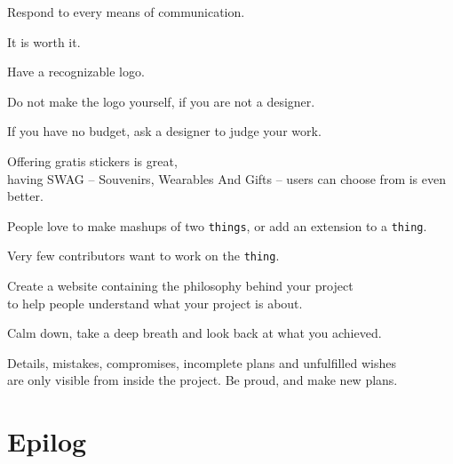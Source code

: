 \documentclass[t,handout,aspectratio=169]{beamer}
\begin{document}
\begin{frame}[fragile]%
    \vfill
    Respond to every means of communication.

    It is worth it.
\end{frame}

\begin{frame}[fragile]%
    \vfill
    Have a recognizable logo. \pause

    Do not make the logo yourself, if you are not a designer. \pause

    If you have no budget, ask a designer to judge your work.
\end{frame}

\begin{frame}[fragile]%
    \vfill
    Offering gratis stickers is great, \pause \\
    having SWAG -- Souvenirs, Wearables And Gifts -- users can choose from is even better.
\end{frame}

\begin{frame}[fragile]%
    \vfill
    People love to make mashups of two \texttt{things}, or add an extension to a \texttt{thing}. \pause

    Very few contributors want to work on the \texttt{thing}.
\end{frame}

\begin{frame}[fragile]%
    \vfill
    Create a website containing the philosophy behind your project \\
    to help people understand what your project is about.
\end{frame}

\begin{frame}[fragile]%
    \vfill
    Calm down, take a deep breath and look back at what you achieved. \pause

    Details, mistakes, compromises, incomplete plans and unfulfilled wishes \\
    are only visible from inside the project. Be proud, and make new plans.
\end{frame}

\section{Epilog}
\end{document}
